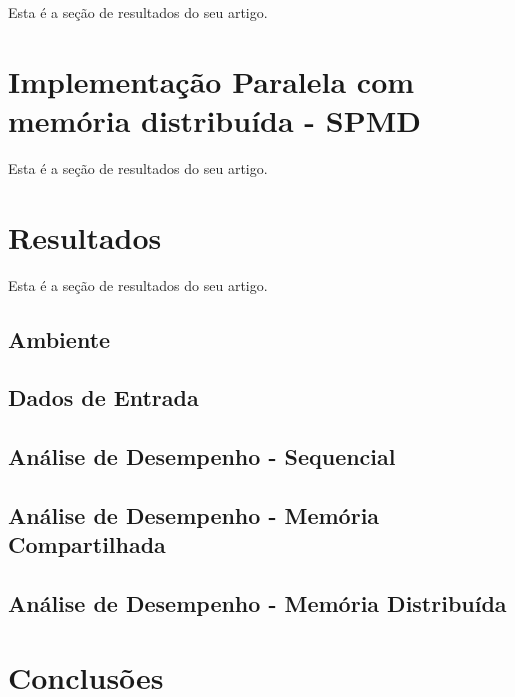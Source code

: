 \documentclass[conference]{IEEEtran}
\begin{document}
Esta é a seção de resultados do seu artigo.

\section{Implementação Paralela com memória distribuída - SPMD}

Esta é a seção de resultados do seu artigo.

\section{Resultados}

Esta é a seção de resultados do seu artigo.

\subsection{Ambiente}

\subsection{Dados de Entrada}

\subsection{Análise de Desempenho - Sequencial}

\subsection{Análise de Desempenho - Memória Compartilhada}

\subsection{Análise de Desempenho - Memória Distribuída}

\section{Conclusões}

\nocite{*}


\end{document}

